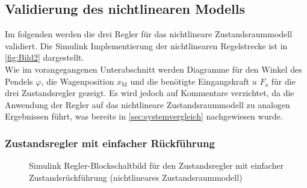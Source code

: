 \newpage

\subsection{Validierung des nichtlinearen Modells}
Im folgenden werden die drei Regler für das nichtlineare Zustandsraummodell validiert. Die Simulink Implementierung der nichtlinearen Regelstrecke ist in \autoref{fig:Bild2} dargestellt. \\
\newline
Wie im vorangegangenen Unterabschnitt werden Diagramme für den Winkel des Pendels $\varphi$, die Wagenposition $x_{\mathrm{M}}$ und die benötigte Eingangskraft $u$ \bzw $F_{\mathrm{a}}$ für die drei Zustandsregler gezeigt. Es wird jedoch auf Kommentare verzichtet, da die Anwendung der Regler auf das nichtlineare Zustandsraummodell zu analogen Ergebnissen führt, was bereits in \autoref{sec:systemvergleich} nachgewiesen wurde.

\subsubsection{Zustandsregler mit einfacher Rückführung}

\begin{figure}[H]
    \centering
    \caption[Zustandsregler mit einfacher Rückführung - Simulink (nichtlinear)]{Simulink Regler-Blockschaltbild für den Zustandsregler mit einfacher Zustandsrückführung (nichtlineares Zustandsraummodell)}
    \label{fig:Bild28}
\end{figure}

